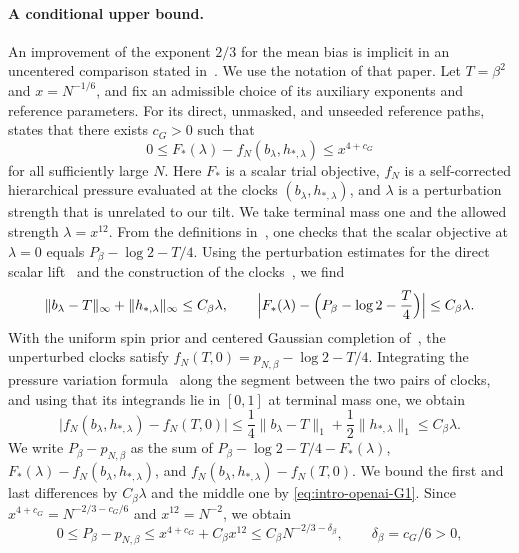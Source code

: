 \paragraph{A conditional upper bound.}
An improvement of the exponent $2/3$ for the mean bias is implicit in an
uncentered comparison stated in~\cite{OpenAILimitingLaw}. We use the
notation of that paper. Let $T=\beta^2$ and $x=N^{-1/6}$, and fix an
admissible choice of its auxiliary exponents and reference parameters.
For its direct, unmasked, and unseeded reference paths,
\cite[Proposition~6.1, (G1)]{OpenAILimitingLaw} states that there
exists $c_G>0$ such that
\begin{equation}\label{eq:intro-openai-G1}
 0\le F_*(\lambda)-f_N(b_\lambda,h_{*,\lambda})\le x^{4+c_G}
\end{equation}
for all sufficiently large $N$. Here $F_*$ is a scalar trial objective,
$f_N$ is a self-corrected hierarchical pressure evaluated at the clocks
$(b_\lambda,h_{*,\lambda})$, and $\lambda$ is a perturbation strength
that is unrelated to our tilt. We take terminal mass one and the
allowed strength $\lambda=x^{12}$. From the definitions
in~\cite[Section~3.1]{OpenAILimitingLaw}, one checks that the scalar
objective at $\lambda=0$ equals $P_\beta-\log2-T/4$. Using the perturbation estimates for the direct
scalar lift~\cite[Section~3.2, proof of Lemma~3.2]{OpenAILimitingLaw}
and the construction of the clocks~\cite[Section~3.4,
(P3)--(P4)]{OpenAILimitingLaw}, we find
\[
 \|b_\lambda-T\|_\infty+\|h_{*,\lambda}\|_\infty\le C_\beta\lambda,
 \qquad
 \Bigl|F_*(\lambda)-\Bigl(P_\beta-\log2-\frac T4\Bigr)\Bigr|
 \le C_\beta\lambda.
\]
With the uniform spin prior and centered Gaussian completion
of~\cite[Section~2.1]{OpenAILimitingLaw}, the unperturbed clocks satisfy
$f_N(T,0)=p_{N,\beta}-\log2-T/4$. Integrating the pressure variation
formula~\cite[Lemma~2.1, (A1)]{OpenAILimitingLaw} along the segment
between the two pairs of clocks, and using that its integrands lie in
$[0,1]$ at terminal mass one, we obtain
\[
 \bigl|f_N(b_\lambda,h_{*,\lambda})-f_N(T,0)\bigr|
 \le\frac14\|b_\lambda-T\|_1+\frac12\|h_{*,\lambda}\|_1
 \le C_\beta\lambda.
\]
We write $P_\beta-p_{N,\beta}$ as the sum of
$P_\beta-\log2-T/4-F_*(\lambda)$,
$F_*(\lambda)-f_N(b_\lambda,h_{*,\lambda})$, and
$f_N(b_\lambda,h_{*,\lambda})-f_N(T,0)$. We bound the first and last
differences by $C_\beta\lambda$ and the middle one by
\eqref{eq:intro-openai-G1}. Since $x^{4+c_G}=N^{-2/3-c_G/6}$ and
$x^{12}=N^{-2}$, we obtain
\begin{equation}\label{eq:intro-openai-bias}
 0\le P_\beta-p_{N,\beta}
 \le x^{4+c_G}+C_\beta x^{12}
 \le C_\beta N^{-2/3-\delta_\beta},\qquad
 \delta_\beta=c_G/6>0,
\end{equation}
